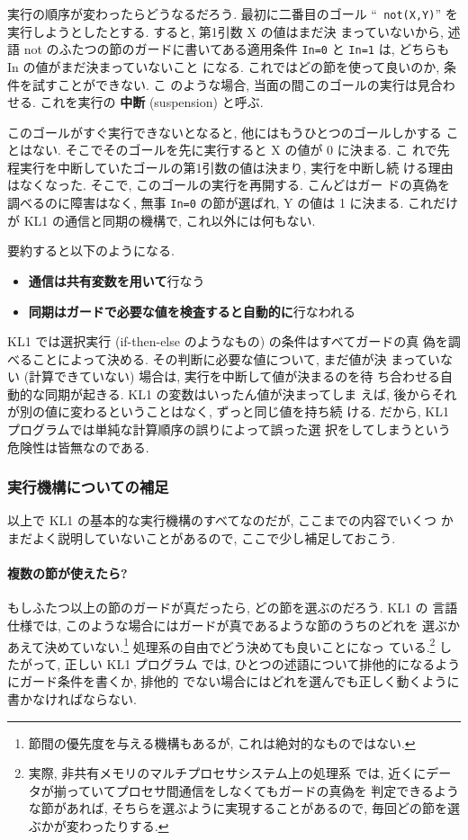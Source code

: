 \documentclass[a4,titlepage]{jsreport}
\def\em{\bf\dg}
\let\dg\bf
\begin{document}
実行の順序が変わったらどうなるだろう.  最初に二番目のゴール ``{\tt
not(X,Y)}'' を実行しようとしたとする.  すると, 第1引数 X の値はまだ決
まっていないから, 述語 not のふたつの節のガードに書いてある適用条件 
{\tt In=0} と {\tt In=1} は, どちらも In の値がまだ決まっていないこと
になる.  これではどの節を使って良いのか, 条件を試すことができない.  こ
のような場合, 当面の間このゴールの実行は見合わせる.  これを実行の{\em 
中断} (suspension) と呼ぶ.

このゴールがすぐ実行できないとなると, 他にはもうひとつのゴールしかする
ことはない.  そこでそのゴールを先に実行すると X の値が 0 に決まる.  こ
れで先程実行を中断していたゴールの第1引数の値は決まり, 実行を中断し続
ける理由はなくなった.  そこで, このゴールの実行を再開する.  こんどはガー
ドの真偽を調べるのに障害はなく, 無事 {\tt In=0} の節が選ばれ, Y の値は 
1 に決まる.  これだけが KL1 の通信と同期の機構で, これ以外には何もない.

要約すると以下のようになる.
\begin{itemize}
\item
{\em 通信は共有変数を用いて}行なう
\item
{\em 同期はガードで必要な値を検査すると自動的に}行なわれる
\end{itemize}
KL1 では選択実行 (if-then-else のようなもの) の条件はすべてガードの真
偽を調べることによって決める.  その判断に必要な値について, まだ値が決
まっていない (計算できていない) 場合は, 実行を中断して値が決まるのを待
ち合わせる自動的な同期が起きる.  KL1 の変数はいったん値が決まってしま
えば, 後からそれが別の値に変わるということはなく, ずっと同じ値を持ち続
ける.  だから, KL1 プログラムでは単純な計算順序の誤りによって誤った選
択をしてしまうという危険性は皆無なのである.

\subsubsection{実行機構についての補足}
以上で KL1 の基本的な実行機構のすべてなのだが, ここまでの内容でいくつ
かまだよく説明していないことがあるので, ここで少し補足しておこう.

\paragraph{複数の節が使えたら?}
もしふたつ以上の節のガードが真だったら, どの節を選ぶのだろう.  KL1 の
言語仕様では, このような場合にはガードが真であるような節のうちのどれを
選ぶかあえて決めていない.\footnote{節間の優先度を与える機構もあるが, 
これは絶対的なものではない.} 処理系の自由でどう決めても良いことになっ
ている.\footnote{実際, 非共有メモリのマルチプロセサシステム上の処理系
では, 近くにデータが揃っていてプロセサ間通信をしなくてもガードの真偽を
判定できるような節があれば, そちらを選ぶように実現することがあるので, 
毎回どの節を選ぶかが変わったりする.} したがって, 正しい KL1 プログラム
では, ひとつの述語について排他的になるようにガード条件を書くか, 排他的
でない場合にはどれを選んでも正しく動くように書かなければならない.
\end{document}
